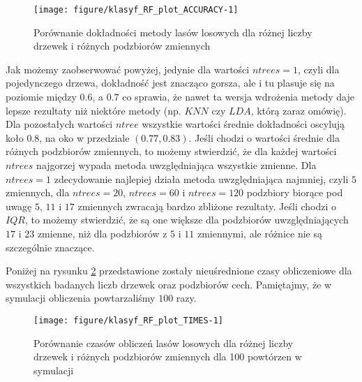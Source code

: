 \documentclass[12pt, a4paper]{article}\usepackage[]{graphicx}\usepackage[]{xcolor}
\makeatletter
\def\maxwidth{ %
  \ifdim\Gin@nat@width>\linewidth
    \linewidth
  \else
    \Gin@nat@width
  \fi
}
\newenvironment{knitrout}{}{} %
\makeatother
\begin{document}
\begin{knitrout}
\color{fgcolor}\begin{figure}[H]

{\centering \texttt{[image: figure/klasyf\_RF\_plot\_ACCURACY-1]} 

}

\caption[Porównanie dokładności metody lasów losowych dla różnej liczby drzewek i różnych podzbiorów zmiennych]{Porównanie dokładności metody lasów losowych dla różnej liczby drzewek i różnych podzbiorów zmiennych}\label{fig:klasyf_RF_plot_ACCURACY}
\end{figure}

\end{knitrout}
Jak możemy zaobserwować powyżej, jedynie dla wartości $ntrees=1$, czyli dla pojedynczego drzewa, dokładność jest znacząco gorsza, ale i tu plasuje się na poziomie między $0.6$, a $0.7$ co sprawia, że nawet ta wersja wdrożenia metody daje lepsze rezultaty niż niektóre metody (np. $KNN$ czy $LDA$, którą zaraz omówię). Dla pozostałych wartości $ntree$ wszystkie wartości średnie dokładności oscylują koło $0.8$, na oko w przedziale $(0.77, 0.83)$. Jeśli chodzi o wartości średnie dla różnych podzbiorów zmiennych, to możemy stwierdzić, że dla każdej wartości $ntrees$ najgorzej wypada metoda uwzględniająca wszystkie zmienne. Dla $ntrees=1$ zdecydowanie najlepiej działa metoda uwzględniająca najmniej, czyli $5$ zmiennych, dla $ntrees=20$, $ntrees=60$ i $ntrees=120$ podzbiory biorące pod uwagę $5$, $11$ i $17$ zmiennych zwracają bardzo zbliżone rezultaty. Jeśli chodzi o $IQR$, to możemy stwierdzić, że są one większe dla podzbiorów uwzględniających $17$ i $23$ zmienne, niż dla podzbiorów z $5$ i $11$ zmiennymi, ale różnice nie są szczególnie znaczące.

Poniżej na rysunku \ref{fig:klasyf_RF_plot_TIMES} przedstawione zostały nieuśrednione czasy obliczeniowe dla wszystkich badanych liczb drzewek oraz podzbiorów cech. Pamiętajmy, że w symulacji obliczenia powtarzaliśmy $100$ razy.

\begin{knitrout}
\color{fgcolor}\begin{figure}[H]

{\centering \texttt{[image: figure/klasyf\_RF\_plot\_TIMES-1]} 

}

\caption[Porównanie czasów obliczeń lasów losowych dla różnej liczby drzewek i różnych podzbiorów zmiennych dla 100 powtórzen w symulacji]{Porównanie czasów obliczeń lasów losowych dla różnej liczby drzewek i różnych podzbiorów zmiennych dla 100 powtórzen w symulacji}\label{fig:klasyf_RF_plot_TIMES}
\end{figure}

\end{knitrout}
\end{document}
